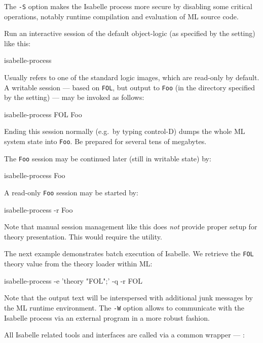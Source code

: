 \begin{isabellebody}
\begin{isamarkuptext}
  \medskip The \verb|-S| option makes the Isabelle process more
  secure by disabling some critical operations, notably runtime
  compilation and evaluation of ML source code.%
\end{isamarkuptext}%
\isamarkuptrue%
%
\isamarkuptrue%
%
\begin{isamarkuptext}%
Run an interactive session of the default object-logic (as specified
  by the \hyperlink{setting.ISABELLE-LOGIC}{\mbox{}} setting) like this:
\begin{ttbox}
isabelle-process
\end{ttbox}

  Usually \hyperlink{setting.ISABELLE-LOGIC}{\mbox{}} refers to one of the standard
  logic images, which are read-only by default.  A writable session
  --- based on \verb|FOL|, but output to \verb|Foo| (in the
  directory specified by the \hyperlink{setting.ISABELLE-OUTPUT}{\mbox{}} setting) ---
  may be invoked as follows:
\begin{ttbox}
isabelle-process FOL Foo
\end{ttbox}
  Ending this session normally (e.g.\ by typing control-D) dumps the
  whole ML system state into \verb|Foo|. Be prepared for several
  tens of megabytes.

  The \verb|Foo| session may be continued later (still in
  writable state) by:
\begin{ttbox}
isabelle-process Foo
\end{ttbox}
  A read-only \verb|Foo| session may be started by:
\begin{ttbox}
isabelle-process -r Foo
\end{ttbox}

  \medskip Note that manual session management like this does
  \emph{not} provide proper setup for theory presentation.  This would
  require the \hyperlink{tool.usedir}{\mbox{}} utility.

  \bigskip The next example demonstrates batch execution of Isabelle.
  We retrieve the \verb|FOL| theory value from the theory loader
  within ML:
\begin{ttbox}
isabelle-process -e 'theory "FOL";' -q -r FOL
\end{ttbox}
  Note that the output text will be interspersed with additional junk
  messages by the ML runtime environment.  The \verb|-W| option
  allows to communicate with the Isabelle process via an external
  program in a more robust fashion.%
\end{isamarkuptext}%
\isamarkuptrue%
%
\isamarkuptrue%
%
\begin{isamarkuptext}%
All Isabelle related tools and interfaces are called via a common
  wrapper --- \hyperlink{executable.isabelle}{\mbox{}}:


\end{isamarkuptext}
\end{isabellebody}
